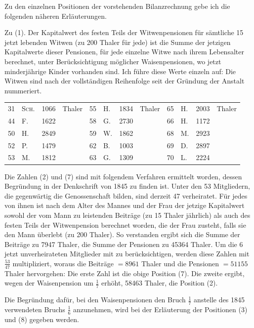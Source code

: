\noindent\hspace*{\parindent}Zu den einzelnen Positionen der vorstehenden Bilanzrechnung gebe ich die folgenden näheren Erläuterungen.

Zu (1). Der Kapitalwert des festen Teils der Witwenpensionen für sämtliche 15 jetzt lebenden Witwen (zu 200 Thaler für jede) ist die Summe der jetzigen Kapitalwerte dieser Pensionen, für jede einzelne Witwe nach ihrem Lebensalter berechnet, unter Berücksichtigung möglicher Waisenpensionen, wo jetzt minderjährige Kinder vorhanden sind. Ich führe diese Werte einzeln auf: Die Witwen sind nach der vollständigen Reihenfolge seit der Gründung der Anstalt nummeriert.
\begin{center}
\footnotesize\setlength{\tabcolsep}{3pt}
\begin{tabular}{r|l|r l||r|l|r l||r|l|r l}
31&\textsc{Sch.}&1066&Thaler&55&H.&1834&Thaler&65&H.&2003&Thaler\\
44&F.&1622&&58&G.&2730&&66&H.&1172&\\
50&H.&2849&&59&W.&1862&&68&M.&2923&\\
52&P.&1479&&62&B.&1003&&69&D.&2897&\\
53&M.&1812&&63&G.&1309&&70&L.&2224&
\end{tabular}
\end{center}
\noindent\hspace*{\parindent}Die Zahlen (2) und (7) sind mit folgendem Verfahren ermittelt worden, dessen Begründung in der Denkschrift von 1845 zu finden ist. Unter den 53 Mitgliedern, die gegenwärtig die Genossenschaft bilden, sind derzeit 47 verheiratet. Für jedes von ihnen ist nach dem Alter des Mannes und der Frau der jetzige Kapitalwert sowohl der vom Mann zu leistenden Beiträge (zu 15 Thaler jährlich) als auch des festen Teils der Witwenpension berechnet worden, die der Frau zusteht, falls sie den Mann überlebt (zu 200 Thaler). So verstanden ergibt sich die Summe der Beiträge zu 7947 Thaler, die Summe der Pensionen zu 45364 Thaler. Um die 6 jetzt unverheirateten Mitglieder mit zu berücksichtigen, werden diese Zahlen mit \(\tfrac{53}{47}\) multipliziert, woraus die Beiträge \(=8961\) Thaler und die Pensionen \(=51155\) Thaler hervorgehen: Die erste Zahl ist die obige Position (7). Die zweite ergibt, wegen der Waisenpension um \(\tfrac{1}{7}\) erhöht, 58463 Thaler, die Position (2).

Die Begründung dafür, bei den Waisenpensionen den Bruch \(\tfrac{1}{7}\) anstelle des 1845 verwendeten Bruchs \(\tfrac{1}{6}\) anzunehmen, wird bei der Erläuterung der Positionen (3) und (8) gegeben werden.

